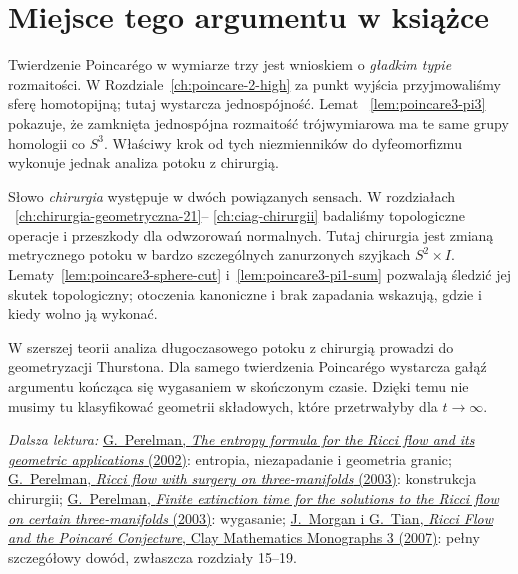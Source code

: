 \section{Miejsce tego argumentu w książce}
\label{sec:poincare3-miejsce}

Twierdzenie Poincarégo w wymiarze trzy jest
wnioskiem o \emph{gładkim typie} rozmaitości.
W Rozdziale~\ref{ch:poincare-2-high} za punkt
wyjścia przyjmowaliśmy sferę homotopijną;
tutaj wystarcza jednospójność. Lemat
~\ref{lem:poincare3-pi3} pokazuje, że
zamknięta jednospójna rozmaitość trójwymiarowa ma
te same grupy homologii co $S^3$.
Właściwy krok od tych niezmienników do
dyfeomorfizmu wykonuje jednak analiza
potoku z chirurgią.

Słowo \emph{chirurgia} występuje w dwóch
powiązanych sensach. W rozdziałach
~\ref{ch:chirurgia-geometryczna-21}--
\ref{ch:ciag-chirurgii} badaliśmy topologiczne
operacje i przeszkody dla odwzorowań normalnych.
Tutaj chirurgia jest zmianą metrycznego potoku
w bardzo szczególnych zanurzonych szyjkach
$S^2\times I$. Lematy~\ref{lem:poincare3-sphere-cut}
i~\ref{lem:poincare3-pi1-sum} pozwalają
śledzić jej skutek topologiczny; otoczenia
kanoniczne i brak zapadania wskazują,
gdzie i kiedy wolno ją wykonać.

W szerszej teorii analiza długoczasowego
potoku z chirurgią prowadzi do geometryzacji
Thurstona. Dla samego twierdzenia Poincarégo
wystarcza gałąź argumentu kończąca się
wygasaniem w skończonym czasie. Dzięki temu
nie musimy tu klasyfikować geometrii
składowych, które przetrwałyby dla
$t\to\infty$.

\par\smallskip
{\footnotesize\noindent\emph{Dalsza lektura:}
\href{https://arxiv.org/pdf/math/0211159}
{G.\ Perelman, \emph{The entropy formula for the Ricci
flow and its geometric applications} (2002)}:
entropia, niezapadanie i geometria granic;
\href{https://arxiv.org/pdf/math/0303109}
{G.\ Perelman, \emph{Ricci flow with surgery on
three-manifolds} (2003)}: konstrukcja chirurgii;
\href{https://arxiv.org/pdf/math/0307245}
{G.\ Perelman, \emph{Finite extinction time for
the solutions to the Ricci flow on certain
three-manifolds} (2003)}: wygasanie;
\href{https://www.claymath.org/library/monographs/cmim03.pdf}
{J.\ Morgan i G.\ Tian, \emph{Ricci Flow and the
Poincaré Conjecture}, Clay Mathematics Monographs 3
(2007)}: pełny szczegółowy dowód, zwłaszcza
rozdziały 15--19.\par}
